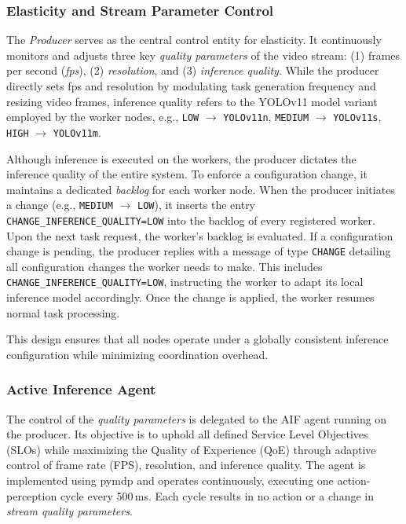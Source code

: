\subsubsection{Elasticity and Stream Parameter Control}
The \textit{Producer} serves as the central control entity for elasticity. It continuously monitors and adjusts three key \textit{quality parameters} of the video stream: (1) frames per second (\textit{fps}), (2) \textit{resolution}, and (3) \textit{inference quality}. While the producer directly sets fps and resolution by modulating task generation frequency and resizing video frames, inference quality refers to the YOLOv11 model variant employed by the worker nodes, e.g., \texttt{LOW} $\rightarrow$ \texttt{YOLOv11n}, \texttt{MEDIUM} $\rightarrow$ \texttt{YOLOv11s}, \texttt{HIGH} $\rightarrow$ \texttt{YOLOv11m}.

Although inference is executed on the workers, the producer dictates the inference quality of the entire system. To enforce a configuration change, it maintains a dedicated \textit{backlog} for each worker node. When the producer initiates a change (e.g., \texttt{MEDIUM} $\rightarrow$ \texttt{LOW}), it inserts the entry \texttt{CHANGE\_INFERENCE\_QUALITY=LOW} into the backlog of every registered worker. Upon the next task request, the worker's backlog is evaluated. If a configuration change is pending, the producer replies with a message of type \texttt{CHANGE} detailing all configuration changes the worker needs to make. This includes \texttt{CHANGE\_INFERENCE\_QUALITY=LOW}, instructing the worker to adapt its local inference model accordingly. Once the change is applied, the worker resumes normal task processing.

This design ensures that all nodes operate under a globally consistent inference configuration while minimizing coordination overhead.

\subsubsection{Active Inference Agent}
\label{sec:evaluation-implementation-active-infernce-agemt}
The control of the \textit{quality parameters} is delegated to the AIF agent running on the producer. Its objective is to uphold all defined Service Level Objectives (SLOs) while maximizing the Quality of Experience (QoE) through adaptive control of frame rate (FPS), resolution, and inference quality. The agent is implemented using pymdp \cite{heins_pymdp_2022} and operates continuously, executing one action-perception cycle every 500\,ms. Each cycle results in no action or a change in \textit{stream quality parameters}. 

